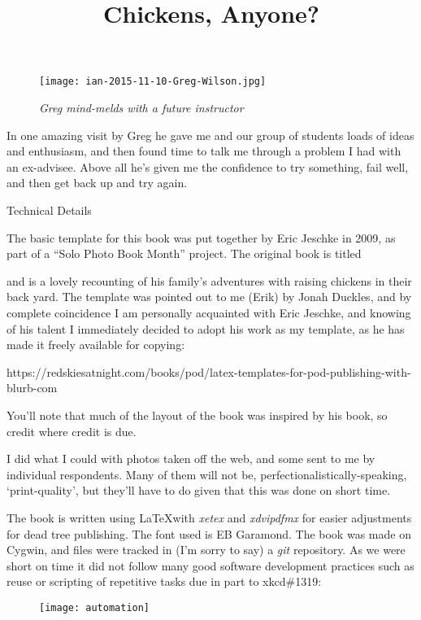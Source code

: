 
\newpage
\begin{figure}[h!]
\centering
\texttt{[image: ian-2015-11-10-Greg-Wilson.jpg]}
\caption*{\textit{Greg mind-melds with a future instructor}}
\end{figure}
\vspace{-0.25cm}

In one amazing visit by Greg he gave me and our group of students loads of
ideas and enthusiasm, and then found time to talk me through a problem I had
with an ex-advisee. Above all he's given me the confidence to try something,
fail well, and then get back up and try again.


\newpage

{\LARGE Technical Details}

The basic template for this book was put together by Eric Jeschke in
2009, as part of a ``Solo Photo Book Month'' project.  The original book
is titled \title{Chickens, Anyone?} and is a lovely recounting of his
family's adventures with raising chickens in their back yard.  The template
was pointed out to me (Erik) by Jonah Duckles, and by complete coincidence
I am personally acquainted with Eric Jeschke, and knowing of his talent I
immediately decided to adopt his work as my template, as he has made it
freely available for copying:

https://redskiesatnight.com/books/pod/latex-templates-for-pod-publishing-with-blurb-com

You'll note that much of the layout of the book was inspired by his book,
so credit where credit is due.

I did what I could with photos taken off the web, and some sent to me by
individual respondents.  Many of them will not be,
perfectionalistically-speaking, `print-quality', but they'll have to do given
that this was done on short time.

The book is written using \LaTeX with {\em xetex} and {\em xdvipdfmx} for
easier adjustments for dead tree publishing.  The font used is EB Garamond.
The book was made on Cygwin, and files were tracked in (I'm sorry to say) a
{\em git} repository.  As we were short on time it did not follow many good
software development practices such as reuse or scripting of repetitive tasks
due in part to xkcd\#1319:
\begin{figure}[h!]
\centering
\texttt{[image: automation]}
\end{figure}

